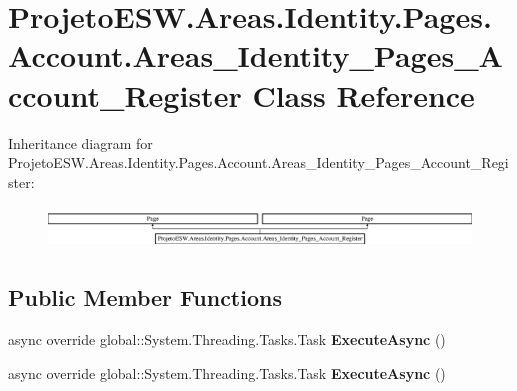 \hypertarget{class_projeto_e_s_w_1_1_areas_1_1_identity_1_1_pages_1_1_account_1_1_areas___identity___pages___account___register}{}\section{Projeto\+E\+S\+W.\+Areas.\+Identity.\+Pages.\+Account.\+Areas\+\_\+\+Identity\+\_\+\+Pages\+\_\+\+Account\+\_\+\+Register Class Reference}
\label{class_projeto_e_s_w_1_1_areas_1_1_identity_1_1_pages_1_1_account_1_1_areas___identity___pages___account___register}
Inheritance diagram for Projeto\+E\+S\+W.\+Areas.\+Identity.\+Pages.\+Account.\+Areas\+\_\+\+Identity\+\_\+\+Pages\+\_\+\+Account\+\_\+\+Register\+:\begin{figure}[H]
\begin{center}
\leavevmode
\includegraphics[height=1.135903cm]{class_projeto_e_s_w_1_1_areas_1_1_identity_1_1_pages_1_1_account_1_1_areas___identity___pages___account___register}
\end{center}
\end{figure}
\subsection*{Public Member Functions}
\begin{DoxyCompactItemize}
\item 
\mbox{\label{class_projeto_e_s_w_1_1_areas_1_1_identity_1_1_pages_1_1_account_1_1_areas___identity___pages___account___register_a39b8dce008f13c444c779f5d0e90e8cc}} 
async override global\+::\+System.\+Threading.\+Tasks.\+Task {\bfseries Execute\+Async} ()
\item 
\mbox{\label{class_projeto_e_s_w_1_1_areas_1_1_identity_1_1_pages_1_1_account_1_1_areas___identity___pages___account___register_a39b8dce008f13c444c779f5d0e90e8cc}} 
async override global\+::\+System.\+Threading.\+Tasks.\+Task {\bfseries Execute\+Async} ()
\end{DoxyCompactItemize}
